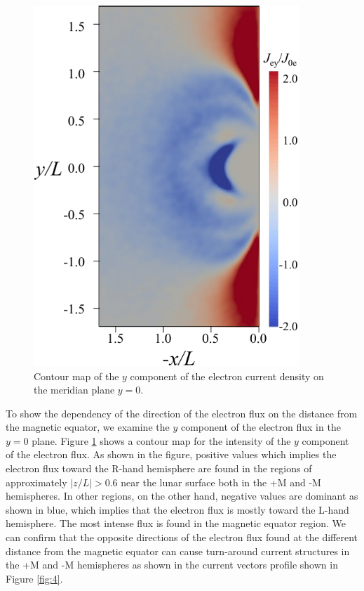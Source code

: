 \documentclass[draft,jgrga]{agutex2015}
\begin{document}
\begin{article}
\begin{figure}[h]
\centering
\noindent\includegraphics[width=10cm]{./figures/Fig_7_bb-crop.pdf}
\caption{Contour map of the $y$ component of the electron current density 
on the meridian plane $y=0$.}\label{fig:7} 
\end{figure}

To show the dependency of the direction of the electron flux on the distance
from the magnetic equator, 
we examine the $y$ component of the electron flux in the $y=0$ plane.
Figure \ref{fig:7} shows a contour map for the intensity of 
the $y$ component of the electron flux.
As shown in the figure, 
positive values which implies the electron flux toward the R-hand hemisphere
are found in the regions of approximately $|z/L| > 0.6$ near the lunar surface
both in the +M and -M hemispheres.
In other regions, on the other hand, 
negative values are dominant as shown in blue, 
which implies that the electron flux is mostly toward the L-hand hemisphere. 
The most intense flux is found in the magnetic equator region.
We can confirm that the opposite directions of the electron flux found 
at the different distance from the magnetic equator can cause 
turn-around current structures in the +M and -M hemispheres
as shown in the current vectors profile shown in Figure \ref{fig:4}.



\end{article}
\end{document}
